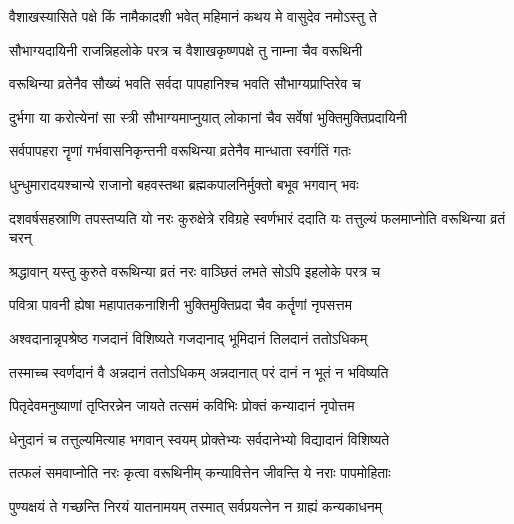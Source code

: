 \label{sec:padma-vaishakha-krishna-varuthini ekadashi}

\ganapatyadiDhyanam
\padmaPuranam



\twolineshloka
{वैशाखस्यासिते पक्षे किं नामैकादशी भवेत्}
{महिमानं कथय मे वासुदेव नमोऽस्तु ते}%


\twolineshloka
{सौभाग्यदायिनी राजन्निहलोके परत्र च}
{वैशाखकृष्णपक्षे तु नाम्ना चैव वरूथिनी}%

\twolineshloka
{वरूथिन्या व्रतेनैव सौख्यं भवति सर्वदा}
{पापहानिश्च भवति सौभाग्यप्राप्तिरेव च}%

\twolineshloka
{दुर्भगा या करोत्येनां सा स्त्री सौभाग्यमाप्नुयात्}
{लोकानां चैव सर्वेषां भुक्तिमुक्तिप्रदायिनी}%

\twolineshloka
{सर्वपापहरा नॄणां गर्भवासनिकृन्तनी}
{वरूथिन्या व्रतेनैव मान्धाता स्वर्गतिं गतः}%

\twolineshloka
{धुन्धुमारादयश्चान्ये राजानो बहवस्तथा}
{ब्रह्मकपालनिर्मुक्तो बभूव भगवान् भवः}%

\threelineshloka
{दशवर्षसहस्राणि तपस्तप्यति यो नरः}
{कुरुक्षेत्रे  रविग्रहे स्वर्णभारं ददाति यः}
{तत्तुल्यं फलमाप्नोति वरूथिन्या व्रतं चरन्}%

\twolineshloka
{श्रद्धावान् यस्तु कुरुते वरूथिन्या व्रतं नरः}
{वाञ्छितं लभते सोऽपि इहलोके परत्र च}%

\twolineshloka
{पवित्रा पावनी ह्येषा महापातकनाशिनी}
{भुक्तिमुक्तिप्रदा चैव कर्तॄणां नृपसत्तम}%

\twolineshloka
{अश्वदानान्नृपश्रेष्ठ गजदानं विशिष्यते}
{गजदानाद् भूमिदानं तिलदानं ततोऽधिकम्}%

\twolineshloka
{तस्माच्च स्वर्णदानं वै अन्नदानं ततोऽधिकम्}
{अन्नदानात् परं दानं न भूतं न भविष्यति}%

\twolineshloka
{पितृदेवमनुष्याणां तृप्तिरन्नेन जायते}
{तत्समं कविभिः प्रोक्तं कन्यादानं नृपोत्तम}%

\twolineshloka
{धेनुदानं च तत्तुल्यमित्याह भगवान् स्वयम्}
{प्रोक्तेभ्यः सर्वदानेभ्यो विद्यादानं विशिष्यते}%

\twolineshloka
{तत्फलं समवाप्नोति नरः कृत्वा वरूथिनीम्}
{कन्यावित्तेन जीवन्ति ये नराः पापमोहिताः}%

\twolineshloka
{पुण्यक्षयं ते गच्छन्ति निरयं यातनामयम्}
{तस्मात् सर्वप्रयत्नेन न ग्राह्यं कन्यकाधनम्}%

